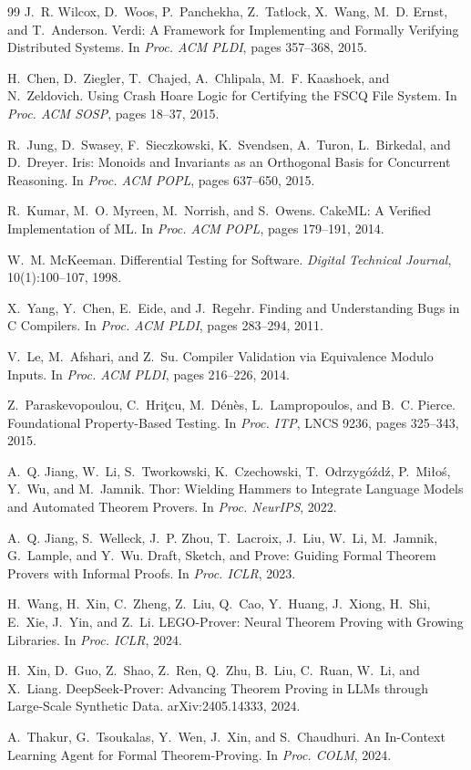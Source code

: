 \documentclass[11pt,a4paper]{article}
\begin{document}
\begin{thebibliography}{99}
J.~R. Wilcox, D.~Woos, P.~Panchekha, Z.~Tatlock, X.~Wang, M.~D. Ernst,
and T.~Anderson.
Verdi: A Framework for Implementing and Formally Verifying Distributed
Systems.
In \emph{Proc. ACM PLDI}, pages 357--368, 2015.

H.~Chen, D.~Ziegler, T.~Chajed, A.~Chlipala, M.~F. Kaashoek, and
N.~Zeldovich.
Using Crash Hoare Logic for Certifying the FSCQ File System.
In \emph{Proc. ACM SOSP}, pages 18--37, 2015.

R.~Jung, D.~Swasey, F.~Sieczkowski, K.~Svendsen, A.~Turon, L.~Birkedal,
and D.~Dreyer.
Iris: Monoids and Invariants as an Orthogonal Basis for Concurrent
Reasoning.
In \emph{Proc. ACM POPL}, pages 637--650, 2015.

R.~Kumar, M.~O. Myreen, M.~Norrish, and S.~Owens.
CakeML: A Verified Implementation of ML.
In \emph{Proc. ACM POPL}, pages 179--191, 2014.

W.~M. McKeeman.
Differential Testing for Software.
\emph{Digital Technical Journal}, 10(1):100--107, 1998.

X.~Yang, Y.~Chen, E.~Eide, and J.~Regehr.
Finding and Understanding Bugs in C Compilers.
In \emph{Proc. ACM PLDI}, pages 283--294, 2011.

V.~Le, M.~Afshari, and Z.~Su.
Compiler Validation via Equivalence Modulo Inputs.
In \emph{Proc. ACM PLDI}, pages 216--226, 2014.

Z.~Paraskevopoulou, C.~Hri\c{t}cu, M.~D\'en\`es, L.~Lampropoulos, and
B.~C. Pierce.
Foundational Property-Based Testing.
In \emph{Proc. ITP}, LNCS 9236, pages 325--343, 2015.

A.~Q. Jiang, W.~Li, S.~Tworkowski, K.~Czechowski, T.~Odrzyg\'o\'zd\'z,
P.~Mi\l{}o\'s, Y.~Wu, and M.~Jamnik.
Thor: Wielding Hammers to Integrate Language Models and Automated
Theorem Provers.
In \emph{Proc. NeurIPS}, 2022.

A.~Q. Jiang, S.~Welleck, J.~P. Zhou, T.~Lacroix, J.~Liu, W.~Li,
M.~Jamnik, G.~Lample, and Y.~Wu.
Draft, Sketch, and Prove: Guiding Formal Theorem Provers with Informal
Proofs.
In \emph{Proc. ICLR}, 2023.

H.~Wang, H.~Xin, C.~Zheng, Z.~Liu, Q.~Cao, Y.~Huang, J.~Xiong, H.~Shi,
E.~Xie, J.~Yin, and Z.~Li.
LEGO-Prover: Neural Theorem Proving with Growing Libraries.
In \emph{Proc. ICLR}, 2024.

H.~Xin, D.~Guo, Z.~Shao, Z.~Ren, Q.~Zhu, B.~Liu, C.~Ruan, W.~Li, and
X.~Liang.
DeepSeek-Prover: Advancing Theorem Proving in LLMs through Large-Scale
Synthetic Data.
arXiv:2405.14333, 2024.

A.~Thakur, G.~Tsoukalas, Y.~Wen, J.~Xin, and S.~Chaudhuri.
An In-Context Learning Agent for Formal Theorem-Proving.
In \emph{Proc. COLM}, 2024.

\end{thebibliography}
\end{document}
